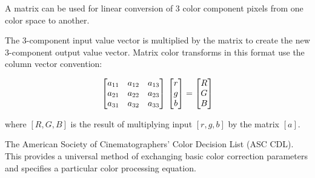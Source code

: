 
A matrix can be used for linear conversion of 3 color component pixels from one color space to another.

The 3-component input value vector is multiplied by the matrix to create the new 3-component output value vector. Matrix color transforms in this format use the column vector convention:

\begin{equation}
    \begin{bmatrix*}
        a_{11} & a_{12} & a_{13} \\
        a_{21} & a_{22} & a_{23} \\
        a_{31} & a_{32} & a_{33} \\
    \end{bmatrix*} \\
    \begin{bmatrix}
        r\\
        g\\
        b
    \end{bmatrix}
    =
    \begin{bmatrix}
        R\\
        G\\
        B
    \end{bmatrix}
\end{equation}

where $[R, G, B]$ is the result of multiplying input $[r, g, b]$ by the matrix $[a]$.

The American Society of Cinematographers' Color Decision List (ASC CDL). This provides a universal method of exchanging basic color correction parameters and specifies a particular color processing equation.